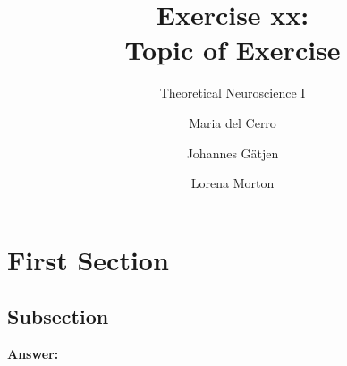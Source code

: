 \documentclass{scrartcl}
\title{Exercise xx:\\Topic of Exercise}
\subtitle{Theoretical Neuroscience I}
\author{Maria del Cerro \and Johannes G\"atjen \and Lorena Morton}
\newcommand\Answer{%
  \textbf{Answer:}%
}
\begin{document}
\maketitle
\section{First Section}
\subsection{Subsection}
\Answer\\
\end{document}
